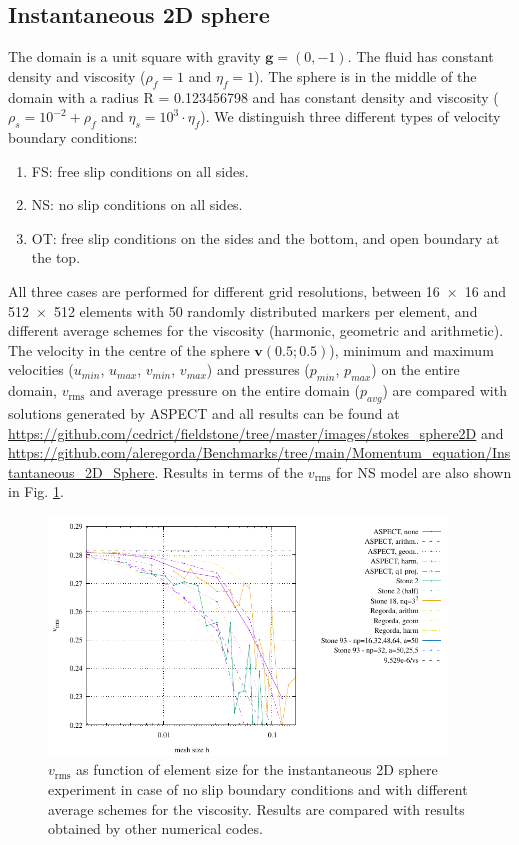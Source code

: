 \documentclass[hidelinks,10pt,a4paper]{article}
\begin{document}
\subsection{Instantaneous 2D sphere}\label{sec:ist_sphere}
The domain is a unit square with gravity $\bm{g}=(0,-1)$. The fluid has constant density and viscosity ($\rho_f=1$ and $\eta_f=1$). The sphere is in the middle
of the domain with a radius R = 0.123456798 and has constant density and viscosity ($\rho_s=10^{-2}+\rho_f$ and $\eta_s=10^3 \cdot \eta_f$).
We distinguish three different types of velocity boundary conditions:
\begin{enumerate}
\item FS: free slip conditions on all sides.
\item NS: no slip conditions on all sides.
\item OT: free slip conditions on the sides and the bottom, and open boundary at the top.
\end{enumerate}
All three cases are performed for different grid resolutions, between \num{16x16} and \num{512x512} elements with 50 randomly distributed markers per element,
and different average schemes for the viscosity (harmonic, geometric and arithmetic). The velocity in the centre of the sphere $\bm{v}(0.5;0.5)$), minimum and
maximum velocities ($u_{min}$, $u_{max}$, $v_{min}$, $v_{max}$) and pressures ($p_{min}$, $p_{max}$) on the entire domain, $v_{\textrm{rms}}$ and average pressure on the
entire domain ($p_{avg}$) are compared with solutions generated by ASPECT \citep{Kronbichler2012,Heister2017,Bangerth2020,Bangerth2020a} and all results
can be found at \url{https://github.com/cedrict/fieldstone/tree/master/images/stokes_sphere2D} and 
\url{https://github.com/aleregorda/Benchmarks/tree/main/Momentum_equation/Instantaneous_2D_Sphere}. Results in terms of the $v_{\textrm{rms}}$ for NS model 
are also shown in Fig. \ref{fig:inst_sphere}.

\begin{figure}
\centering
\noindent\includegraphics[width=400px]{./Figures/vrms_NS.pdf}
\caption{$v_{\textrm{rms}}$ as function of element size for the instantaneous 2D sphere experiment in case of no slip boundary conditions and with different average
schemes for the viscosity. Results are compared with results obtained by other numerical codes.}
\label{fig:inst_sphere}
\end{figure}
\end{document}
